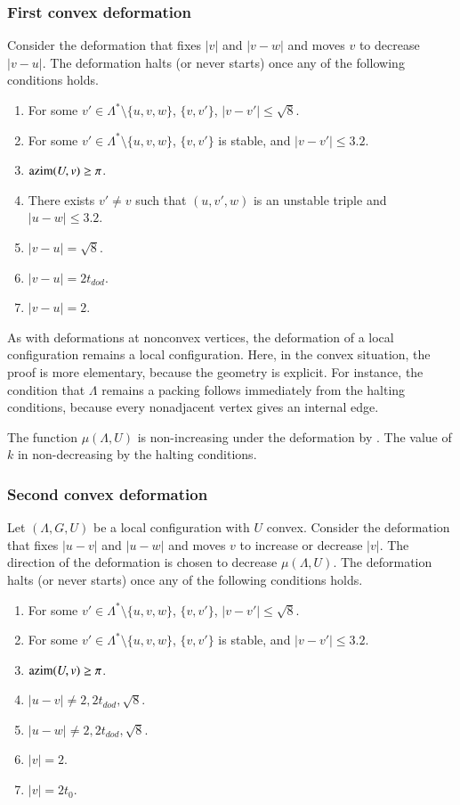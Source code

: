 \documentclass{article} %
\begin{document}
\subsubsection{First convex deformation}

Consider the deformation that fixes $|v|$ and $|v-w|$ and
moves $v$ to decrease $|v-u|$.  
The deformation halts (or never starts) once any
of the following conditions holds.
\begin{enumerate}\label{e:halt-convex}
\item For some $v'\in\Lambda^*\setminus\{u,v,w\}$, 
$\{v,v'\}$, $|v-v'|\le \sqrt8$.
\item For some $v'\in\Lambda^*\setminus\{u,v,w\}$,
$\{v,v'\}$ is  stable, and $|v-v'|\le 3.2$.
\item ${\operatorname{azim}}(U,v)\ge\pi$.
\item There exists $v'\ne v$ such that 
$(u,v',w)$ is an unstable triple and $|u-w|\le3.2$.
\item $|v-u|=\sqrt8$.
\item $|v-u|=2t_{dod}$.
\item $|v-u|=2$.
\end{enumerate}

As with deformations at nonconvex vertices, 
the deformation of a local
configuration remains a local configuration.  Here, in the
convex situation, the proof is more elementary, because the
geometry is explicit.  For instance, the condition that
$\Lambda$ remains a packing follows immediately from the halting
conditions, because every nonadjacent vertex gives an internal
edge.

The function $\mu(\Lambda,U)$ is non-increasing under the
deformation by \cite[Lemma~7.8]{Hales:2002:Dodec}.  The value of
$k$ in non-decreasing by the halting conditions. 

\subsubsection{Second convex deformation}

Let $(\Lambda,G,U)$ be a local configuration with $U$ convex.
Consider the deformation that fixes $|u-v|$ and $|u-w|$ and
moves $v$ to increase or decrease $|v|$.  The direction
of the deformation is chosen to decrease $\mu(\Lambda,U)$.
The deformation halts (or never starts) once any
of the following conditions holds.
\begin{enumerate}\label{e:halt-convex2}
\item For some $v'\in\Lambda^*\setminus\{u,v,w\}$, 
$\{v,v'\}$, $|v-v'|\le \sqrt8$.
\item For some $v'\in\Lambda^*\setminus\{u,v,w\}$,
$\{v,v'\}$ is  stable, and $|v-v'|\le 3.2$.
\item ${\operatorname{azim}}(U,v)\ge\pi$.
\item $|u-v|\ne 2,2t_{dod},\sqrt8$.
\item $|u-w|\ne 2,2t_{dod},\sqrt8$.
\item $|v|=2$.
\item $|v|=2t_0$.
\end{enumerate}
\end{document}
